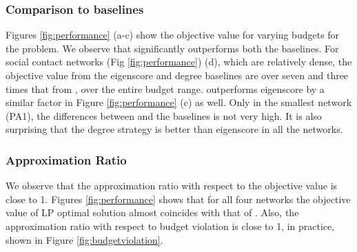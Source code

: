 \subsubsection{Comparison to baselines}
Figures \ref{fig:performance} (a-c) show the objective value
for varying budgets for the \probone{} problem. We observe that \algo{} significantly outperforms
both the baselines. For social contact networks (Fig \ref{fig:performance}) (d), which are relatively dense,
the objective value from the eigenscore and degree baselines are over seven and three times that from
\algo{}, over the entire budget range. \algo{} outperforms eigenscore by a similar factor in Figure \ref{fig:performance} (c) as well.
Only in the smallest network (PA1), the differences between \algo{} and the baselines is not very high.
It is also surprising that the degree strategy is better than eigenscore in all the networks.

\subsubsection{Approximation Ratio}
We observe that the approximation ratio with respect to the objective value is close to 1. Figures \ref{fig:performance} shows that for all four networks the objective value of LP optimal solution almost coincides with that of \algo{}. Also, the approximation ratio with respect to budget violation is close to 1, in practice, shown in Figure \ref{fig:budgetviolation}.

%


